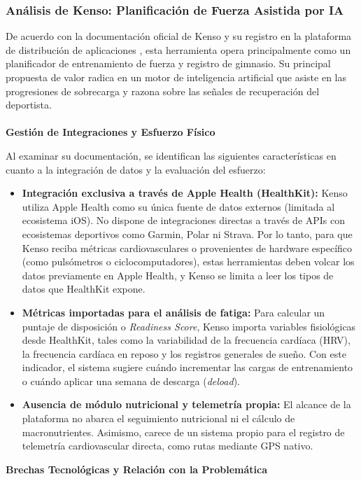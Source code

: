 \documentclass[12pt]{article}
\begin{document}
\subsubsection{Análisis de Kenso: Planificación de Fuerza Asistida por IA}
De acuerdo con la documentación oficial de Kenso y su registro en la plataforma de distribución de aplicaciones \citep{kenso_official, kenso_appstore}, esta herramienta opera principalmente como un planificador de entrenamiento de fuerza y registro de gimnasio. Su principal propuesta de valor radica en un motor de inteligencia artificial que asiste en las progresiones de sobrecarga y razona sobre las señales de recuperación del deportista.
\\\\
\textbf{Gestión de Integraciones y Esfuerzo Físico}

Al examinar su documentación, se identifican las siguientes características en cuanto a la integración de datos y la evaluación del esfuerzo:

\begin{itemize}
    \item \textbf{Integración exclusiva a través de Apple Health (HealthKit):} Kenso utiliza Apple Health como su única fuente de datos externos (limitada al ecosistema iOS). No dispone de integraciones directas a través de APIs con ecosistemas deportivos como Garmin, Polar ni Strava. Por lo tanto, para que Kenso reciba métricas cardiovasculares o provenientes de hardware específico (como pulsómetros o ciclocomputadores), estas herramientas deben volcar los datos previamente en Apple Health, y Kenso se limita a leer los tipos de datos que HealthKit expone.
    \item \textbf{Métricas importadas para el análisis de fatiga:} Para calcular un puntaje de disposición o \textit{Readiness Score}, Kenso importa variables fisiológicas desde HealthKit, tales como la variabilidad de la frecuencia cardíaca (HRV), la frecuencia cardíaca en reposo y los registros generales de sueño. Con este indicador, el sistema sugiere cuándo incrementar las cargas de entrenamiento o cuándo aplicar una semana de descarga (\textit{deload}).
    \item \textbf{Ausencia de módulo nutricional y telemetría propia:} El alcance de la plataforma no abarca el seguimiento nutricional ni el cálculo de macronutrientes. Asimismo, carece de un sistema propio para el registro de telemetría cardiovascular directa, como rutas mediante GPS nativo.
\end{itemize}
\newpage
\textbf{Brechas Tecnológicas y Relación con la Problemática}
\end{document}
